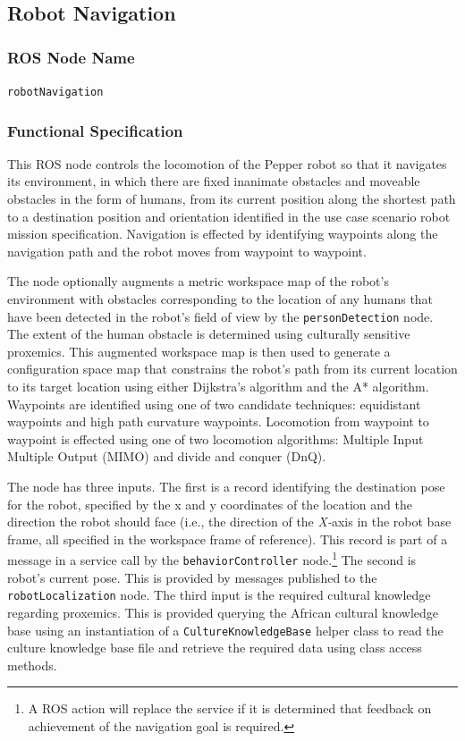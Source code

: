 \documentclass{CSSRforAfrica}
\begin{document}
{{\newpage

\subsection{Robot Navigation }
\label{section:robot_navigation}


\subsubsection*{ROS Node Name}
 {\small \verb+robotNavigation+}   

\subsubsection*{Functional Specification}
This ROS node  controls the locomotion of the Pepper robot so that it navigates its environment, in which there are fixed inanimate obstacles and moveable obstacles in the form of humans, from its current position along the shortest path to a   destination position and orientation identified in the use case scenario robot mission specification.  Navigation is effected by identifying waypoints along the navigation path and the robot moves from waypoint to waypoint.  
 
The node optionally  augments a metric workspace map of the robot's environment with obstacles corresponding to the location of any humans that have been detected in the robot's field of view by the {\small \verb+personDetection+} node. The extent of the human obstacle is determined using culturally sensitive proxemics. This augmented workspace map is then  used to generate a configuration space map that constrains the robot's path from its current location to its target location using either Dijkstra's algorithm and the A* algorithm. Waypoints are identified using one of two candidate techniques: equidistant waypoints and high path curvature waypoints. Locomotion from waypoint to waypoint is  effected using one of two locomotion algorithms: Multiple Input Multiple Output (MIMO) and divide and conquer (DnQ).  

The node has three inputs. The first is a record identifying the destination pose for the robot, specified by the x and y coordinates of the location and the direction the robot should face (i.e., the direction of the {\em X-}axis in the robot base frame, all specified in the workspace frame of reference). This  record is part of a message in a service call by the {\small \verb+behaviorController+} node.\footnote{A ROS action will replace the service if it is determined that feedback on achievement of the navigation goal is required.}   The second is robot's current pose. This is provided by messages published to the  {\small \verb+robotLocalization+} node. The third input is the required cultural knowledge regarding proxemics. This is provided  querying the African cultural knowledge base 
using an instantiation of a  {\small \verb+CultureKnowledgeBase+} helper class to read the culture knowledge base file and retrieve the required data using  class access methods.

}}
\end{document}
